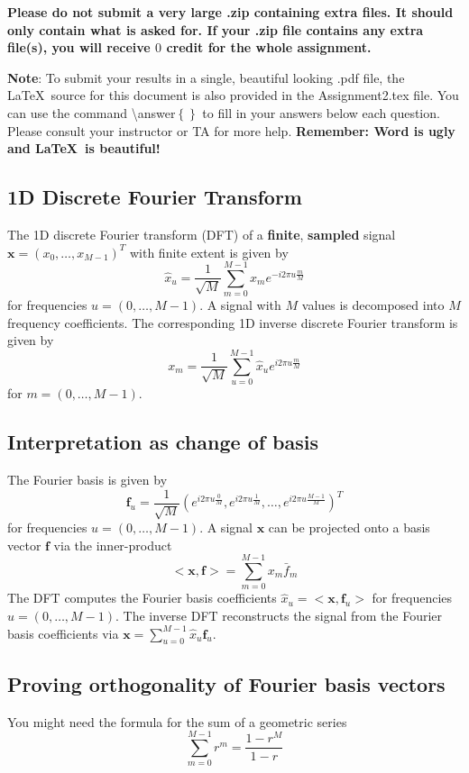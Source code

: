 \documentclass[11pt]{article} %
\begin{document}
\textbf{Please do not submit a very large .zip containing extra files. It should only contain what is asked for. If your .zip file contains any extra file(s), you will receive $0$ credit for the whole assignment.}

\textbf{Note}: To submit your results in a single, beautiful looking .pdf file, the La\TeX~source for this document is also provided in the Assignment2.tex file. You can use the command \textbackslash answer$\left\{\right\}$ to fill in your answers below each question. Please consult your instructor or TA for more help. \textbf{Remember: Word is ugly and La\TeX~is beautiful!}

\newpage

\begin{appendix}
\section{1D Discrete Fourier Transform}
The {\color{red}1D discrete Fourier transform} (DFT) of a \textbf{finite}, \textbf{sampled} signal $\mathbf{x} = (x_0, \dots, x_{M-1})^T$ with finite extent is given by
\begin{equation}
\hat{x}_u=\frac{1}{\sqrt{M}}\sum_{m=0}^{M-1}x_m e^{-i2\pi u \frac{m}{M}}
\end{equation}
for frequencies $u=(0,\dots,M-1)$.
A signal with $M$ values is decomposed into $M$ frequency coefficients.
The corresponding {\color{red}1D inverse discrete Fourier transform} is given by
\begin{equation}
x_m=\frac{1}{\sqrt{M}}\sum_{u=0}^{M-1}\hat{x}_ue^{i2\pi u \frac{m}{M}}
\end{equation}
for $m=(0,\dots,M-1)$.

\subsection{Interpretation as change of basis}
The Fourier basis is given by
\begin{equation}
\mathbf{f}_u=\frac{1}{\sqrt{M}}(e^{i2\pi u \frac{0}{M}},e^{i2\pi u \frac{1}{M}},\dots,e^{i2\pi u \frac{M-1}{M}})^T
\end{equation}
for frequencies $u=(0,\dots,M-1)$.
A signal $\mathbf{x}$ can be projected onto a basis vector $\mathbf{f}$ via the inner-product
\begin{equation}
<\mathbf{x},\mathbf{f}>=\sum_{m=0}^{M-1}x_m\bar{f}_m
\end{equation}
The DFT computes the Fourier basis coefficients $\hat{x}_u=<\mathbf{x},\mathbf{f}_u>$ for frequencies $u=(0,\dots,M-1)$.
The inverse DFT reconstructs the signal from the Fourier basis coefficients via $\mathbf{x}=\sum_{u=0}^{M-1}\hat{x}_u\mathbf{f}_u$.
\end{appendix}

\subsection{Proving orthogonality of Fourier basis vectors}
You might need the formula for the sum of a geometric series
\begin{equation}
\sum_{m=0}^{M-1}r^m=\frac{1-r^M}{1-r}
\end{equation}
\end{document}

